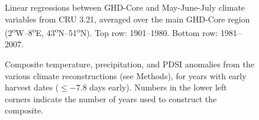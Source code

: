 \documentclass[final]{nature}
\begin{document}
\begin{figure}
\caption{Linear regressions between GHD-Core and May-June-July climate variables from CRU 3.21, averaged over the main GHD-Core region (2\textsuperscript{o}W--8\textsuperscript{o}E, 43\textsuperscript{o}N--51\textsuperscript{o}N). Top row: 1901--1980. Bottom row: 1981--2007.}
\end{figure}

\begin{figure}
\caption{Composite temperature, precipitation, and PDSI anomalies from the various climate reconstructions (see Methods), for years with early harvest dates ($\le-7.8$ days early). Numbers in the lower left corners indicate the number of years used to construct the composite.}
\end{figure}


\end{document}
